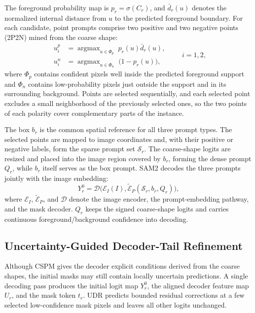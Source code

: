\documentclass{article}
\begin{document}
\indent The foreground probability map is $p_r=\sigma(C_r)$, and $\bar d_r(u)$ denotes the normalized internal distance from $u$ to the predicted foreground boundary. For each candidate, point prompts comprise two positive and two negative points (2P2N) mined from the coarse shape:
\begin{equation}
\begin{aligned}
u^{p}_{i}&=\operatorname{argmax}_{u\in\Phi_{p}}\; p_r(u)\bar d_r(u),\\
u^{n}_{i}&=\operatorname{argmax}_{u\in\Phi_{n}}\;\bigl(1-p_r(u)\bigr),
\end{aligned}
\qquad i=1,2,
\label{eq:mining}
\end{equation}
where $\Phi_{p}$ contains confident pixels well inside the predicted foreground support and $\Phi_{n}$ contains low-probability pixels just outside the support and in its surrounding background. Points are selected sequentially, and each selected point excludes a small neighborhood of the previously selected ones, so the two points of each polarity cover complementary parts of the instance.

\indent The box $b_r$ is the common spatial reference for all three prompt types. The selected points are mapped to image coordinates and, with their positive or negative labels, form the sparse prompt set $\mathcal{S}_r$. The coarse-shape logits are resized and placed into the image region covered by $b_r$, forming the dense prompt $Q_r$, while $b_r$ itself serves as the box prompt. SAM2 decodes the three prompts jointly with the image embedding:
\begin{equation}
Y_r^0=\mathcal{D}\bigl(\mathcal{E}_I(I),
\widetilde{\mathcal{E}}_P(\mathcal{S}_r,b_r,Q_r)\bigr),
\label{eq:native-decoding}
\end{equation}
\noindent where $\mathcal{E}_I$, $\widetilde{\mathcal{E}}_P$, and $\mathcal{D}$ denote the image encoder, the prompt-embedding pathway, and the mask decoder. $Q_r$ keeps the signed coarse-shape logits and carries continuous foreground/background confidence into decoding.

\subsection{Uncertainty-Guided Decoder-Tail Refinement}
 Although CSPM gives the decoder explicit conditions derived from the coarse shapes, the initial masks may still contain locally uncertain predictions. A single decoding pass produces the initial logit map $Y_r^0$, the aligned decoder feature map $U_r$, and the mask token $t_r$. UDR predicts bounded residual corrections at a few selected low-confidence mask pixels and leaves all other logits unchanged.
\end{document}
